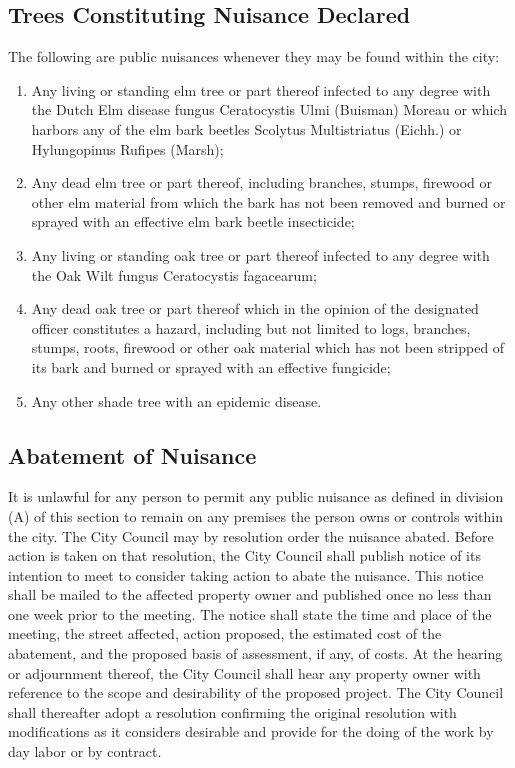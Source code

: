 \subsection{Trees Constituting Nuisance Declared}
The following are public nuisances whenever they may be found within the city:
\begin{enumerate}[{\indent}1)]
    \item Any living or standing elm tree or part thereof infected to any degree with the Dutch Elm disease fungus Ceratocystis Ulmi (Buisman) Moreau or which harbors any of the elm bark beetles Scolytus Multistriatus (Eichh.) or Hylungopinus Rufipes (Marsh);
    \item Any dead elm tree or part thereof, including branches, stumps, firewood or other elm material from which the bark has not been removed and burned or sprayed with an effective elm bark beetle insecticide;
    \item Any living or standing oak tree or part thereof infected to any degree with the Oak Wilt fungus Ceratocystis fagacearum;
    \item Any dead oak tree or part thereof which in the opinion of the designated officer constitutes a hazard, including but not limited to logs, branches, stumps, roots, firewood or other oak material which has not been stripped of its bark and burned or sprayed with an effective fungicide;
    \item Any other shade tree with an epidemic disease.
\end{enumerate}
\subsection{Abatement of Nuisance}
It is unlawful for any person to permit any public nuisance as defined in division (A) of this section to remain on any premises the person owns or controls within the city. The City Council may by resolution order the nuisance abated. Before action is taken on that resolution, the City Council shall publish notice of its intention to meet to consider taking action to abate the nuisance. This notice shall be mailed to the affected property owner and published once no less than one week prior to the meeting. The notice shall state the time and place of the meeting, the street affected, action proposed, the estimated cost of the abatement, and the proposed basis of assessment, if any, of costs. At the hearing or adjournment thereof, the City Council shall hear any property owner with reference to the scope and desirability of the proposed project. The City Council shall thereafter adopt a resolution confirming the original resolution with modifications as it considers desirable and provide for the doing of the work by day labor or by contract.
